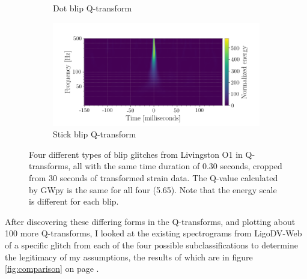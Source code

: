 \documentclass[a4paper]{article}
\begin{document}
\begin{figure}[h!]
\begin{subfigure}{.49\textwidth}
		\caption{Dot blip Q-transform}
		\label{fig:dot}
	\end{subfigure}
	\begin{subfigure}{.49\textwidth}
		\centering
		\includegraphics[width=1\linewidth]{stick_blip}
		\caption{Stick blip Q-transform}
		\label{fig:stick}
	\end{subfigure}
	\caption{Four different types of blip glitches from Livingston O1 in Q-transforms, all with the same time duration of 0.30 seconds, cropped from 30 seconds of transformed strain data. The Q-value calculated by GWpy is the same for all four (5.65). Note that the energy scale is different for each blip.}
	\label{fig:q_transforms}
\end{figure}

After discovering these differing forms in the Q-transforms, and plotting about 100 more Q-transforms, I looked at the existing spectrograms from LigoDV-Web of a specific glitch from each of the four possible subclassifications to determine the legitimacy of my assumptions, the results of which are in figure \ref{fig:comparison} on page \pageref{fig:comparison}. 
\end{document}
